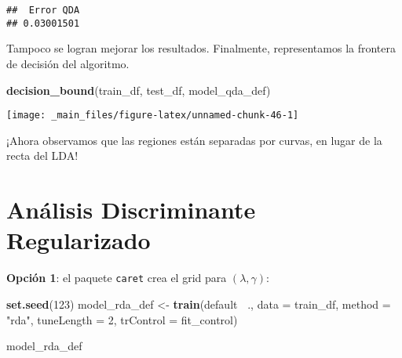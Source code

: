 \documentclass[]{book}
\newenvironment{Shaded}{\begin{snugshade}}{\end{snugshade}}
\newcommand{\CommentTok}[1]{\textcolor[rgb]{0.56,0.35,0.01}{\textit{#1}}}
\newcommand{\DataTypeTok}[1]{\textcolor[rgb]{0.13,0.29,0.53}{#1}}
\newcommand{\DecValTok}[1]{\textcolor[rgb]{0.00,0.00,0.81}{#1}}
\newcommand{\KeywordTok}[1]{\textcolor[rgb]{0.13,0.29,0.53}{\textbf{#1}}}
\newcommand{\NormalTok}[1]{#1}
\newcommand{\OperatorTok}[1]{\textcolor[rgb]{0.81,0.36,0.00}{\textbf{#1}}}
\newcommand{\StringTok}[1]{\textcolor[rgb]{0.31,0.60,0.02}{#1}}
\begin{document}
\begin{Shaded}
\end{Shaded}

\begin{verbatim}
##  Error QDA 
## 0.03001501
\end{verbatim}

Tampoco se logran mejorar los resultados. Finalmente, representamos la frontera de decisión del algoritmo.

\begin{Shaded}
\begin{Highlighting}[]
\KeywordTok{decision_bound}\NormalTok{(train_df, test_df, model_qda_def)}
\end{Highlighting}
\end{Shaded}

\begin{center}\texttt{[image: \_main\_files/figure-latex/unnamed-chunk-46-1]} \end{center}

¡Ahora observamos que las regiones están separadas por curvas, en lugar de la recta del LDA!

\hypertarget{RDA}{%
\section{Análisis Discriminante Regularizado}\label{RDA}}

\textbf{Opción 1}: el paquete \texttt{caret} crea el grid para \((\lambda, \gamma)\):

\begin{Shaded}
\begin{Highlighting}[]
\KeywordTok{set.seed}\NormalTok{(}\DecValTok{123}\NormalTok{)}
\NormalTok{model_rda_def <-}\StringTok{ }\KeywordTok{train}\NormalTok{(default }\OperatorTok{~}\NormalTok{.,}
                       \DataTypeTok{data =}\NormalTok{ train_df,}
                       \DataTypeTok{method =} \StringTok{"rda"}\NormalTok{,}
                       \DataTypeTok{tuneLength =} \DecValTok{2}\NormalTok{,}
                       \DataTypeTok{trControl =}\NormalTok{ fit_control)}

\NormalTok{model_rda_def}
\end{Highlighting}
\end{Shaded}
\end{document}
